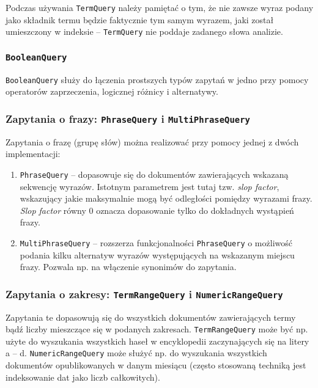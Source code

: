 Podczas używania \texttt{TermQuery} należy pamiętać o tym, że nie zawsze wyraz podany jako składnik termu będzie faktycznie tym samym wyrazem, jaki został umieszczony w indeksie -- \texttt{TermQuery} nie poddaje zadanego słowa analizie.

\subsubsection{\texttt{BooleanQuery}}

\texttt{BooleanQuery} służy do łączenia prostszych typów zapytań w jedno przy pomocy operatorów zaprzeczenia, logicznej różnicy i alternatywy. 

\subsubsection{Zapytania o frazy: \texttt{PhraseQuery} i \texttt{MultiPhraseQuery}}

Zapytania o frazę (grupę słów) można realizować przy pomocy jednej z dwóch implementacji:
\begin{enumerate}
 \item \texttt{PhraseQuery} -- dopasowuje się do dokumentów zawierających wskazaną sekwencję wyrazów. Istotnym parametrem jest tutaj tzw. \emph{slop factor}, wskazujący jakie maksymalnie mogą być odległości pomiędzy wyrazami frazy. \emph{Slop factor} równy 0 oznacza dopasowanie tylko do dokładnych wystąpień frazy. 
 \item \texttt{MultiPhraseQuery} -- rozszerza funkcjonalności \texttt{PhraseQuery} o możliwość podania kilku alternatyw wyrazów występujących na wskazanym miejscu frazy. Pozwala np. na włączenie synonimów do zapytania. 
\end{enumerate}

\subsubsection{Zapytania o zakresy: \texttt{TermRangeQuery} i \texttt{NumericRangeQuery}}

Zapytania te dopasowują się do wszystkich dokumentów zawierających termy bądź liczby mieszczące się w podanych zakresach. \texttt{TermRangeQuery} może być np. użyte do wyszukania wszystkich haseł w encyklopedii zaczynających się na litery a -- d. \texttt{NumericRangeQuery} może służyć np. do wyszukania wszystkich dokumentów opublikowanych w danym miesiącu (często stosowaną techniką jest indeksowanie dat jako liczb całkowitych).

